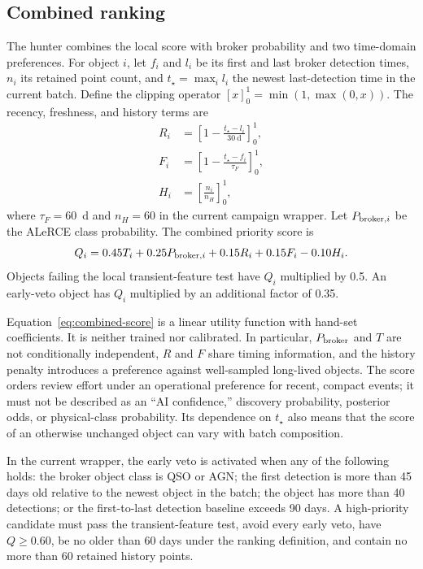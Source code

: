 \documentclass[11pt]{article}
\begin{document}
\subsection{Combined ranking}

The hunter combines the local score with broker probability and two time-domain preferences. For object $i$, let $f_i$ and $l_i$ be its first and last broker detection times, $n_i$ its retained point count, and $t_\star=\max_i l_i$ the newest last-detection time in the current batch. Define the clipping operator $[x]_0^1=\min(1,\max(0,x))$. The recency, freshness, and history terms are
\begin{align}
R_i &= \left[1-\frac{t_\star-l_i}{30~\mathrm{d}}\right]_0^1, \\
F_i &= \left[1-\frac{t_\star-f_i}{\tau_F}\right]_0^1, \\
H_i &= \left[\frac{n_i}{n_H}\right]_0^1,
\end{align}
where $\tau_F=60$~d and $n_H=60$ in the current campaign wrapper. Let $P_{{\rm broker},i}$ be the ALeRCE class probability. The combined priority score is
\begin{equation}
  Q_i = 0.45T_i + 0.25P_{{\rm broker},i} + 0.15R_i + 0.15F_i - 0.10H_i.
\label{eq:combined-score}
\end{equation}
Objects failing the local transient-feature test have $Q_i$ multiplied by 0.5. An early-veto object has $Q_i$ multiplied by an additional factor of 0.35.

Equation~\ref{eq:combined-score} is a linear utility function with hand-set coefficients. It is neither trained nor calibrated. In particular, $P_{\rm broker}$ and $T$ are not conditionally independent, $R$ and $F$ share timing information, and the history penalty introduces a preference against well-sampled long-lived objects. The score orders review effort under an operational preference for recent, compact events; it must not be described as an ``AI confidence,'' discovery probability, posterior odds, or physical-class probability. Its dependence on $t_\star$ also means that the score of an otherwise unchanged object can vary with batch composition.

In the current wrapper, the early veto is activated when any of the following holds: the broker object class is QSO or AGN; the first detection is more than 45 days old relative to the newest object in the batch; the object has more than 40 detections; or the first-to-last detection baseline exceeds 90 days. A high-priority candidate must pass the transient-feature test, avoid every early veto, have $Q\geq0.60$, be no older than 60 days under the ranking definition, and contain no more than 60 retained history points.
\end{document}
